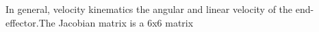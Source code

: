 In general, velocity kinematics the angular and linear velocity of the end-effector.The Jacobian matrix is a 6x6 matrix